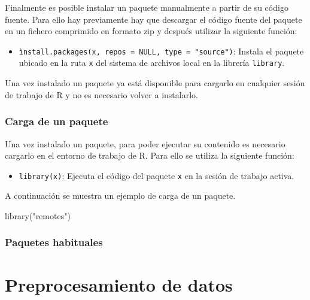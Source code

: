 \documentclass[
]{book}
\newenvironment{Shaded}{\begin{snugshade}}{\end{snugshade}}
\newcommand{\FunctionTok}[1]{\textcolor[rgb]{0.00,0.00,0.00}{#1}}
\newcommand{\NormalTok}[1]{#1}
\newcommand{\StringTok}[1]{\textcolor[rgb]{0.31,0.60,0.02}{#1}}
\providecommand{\tightlist}{%
  \setlength{\itemsep}{0pt}\setlength{\parskip}{0pt}}
\theoremstyle{definition}
\theoremstyle{definition}
\theoremstyle{definition}
\theoremstyle{definition}
\theoremstyle{remark}
\begin{document}
Finalmente es posible instalar un paquete manualmente a partir de su código fuente. Para ello hay previamente hay que descargar el código fuente del paquete en un fichero comprimido en formato zip y después utilizar la siguiente función:

\begin{itemize}
\tightlist
\item
  \texttt{ìnstall.packages(x,\ repos\ =\ NULL,\ type\ =\ "source")}: Instala el paquete ubicado en la ruta \texttt{x} del sistema de archivos local en la librería \texttt{library}.
\end{itemize}

Una vez instalado un paquete ya está disponible para cargarlo en cualquier sesión de trabajo de R y no es necesario volver a instalarlo.

\hypertarget{carga-de-un-paquete}{%
\subsection{Carga de un paquete}\label{carga-de-un-paquete}}

Una vez instalado un paquete, para poder ejecutar su contenido es necesario cargarlo en el entorno de trabajo de R. Para ello se utiliza la siguiente función:

\begin{itemize}
\tightlist
\item
  \texttt{library(x)}: Ejecuta el código del paquete \texttt{x} en la sesión de trabajo activa.
\end{itemize}

A continuación se muestra un ejemplo de carga de un paquete.

\begin{Shaded}
\begin{Highlighting}[]
\FunctionTok{library}\NormalTok{(}\StringTok{"remotes"}\NormalTok{)}
\end{Highlighting}
\end{Shaded}

\hypertarget{paquetes-habituales}{%
\subsection{Paquetes habituales}\label{paquetes-habituales}}

\hypertarget{preprocesamiento-de-datos}{%
\chapter{Preprocesamiento de datos}\label{preprocesamiento-de-datos}}
\end{document}
